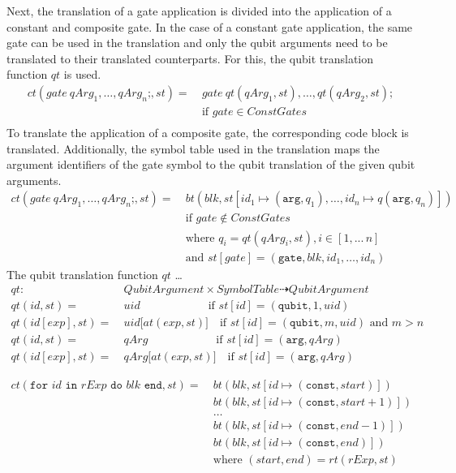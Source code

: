 Next, the translation of a gate application is divided into the application of a constant and composite gate. In the case of a constant gate application, the same gate can be used in the translation and only the qubit arguments need to be translated to their translated counterparts. For this, the qubit translation function $qt$ is used. 
\begin{align*}
    ct(gate \ qArg_1, \dots, qArg_n\texttt{;}, st) = \ & gate \ qt(qArg_1, st), \dots, qt(qArg_2, st); \\
                                                       & \text{if } gate \in ConstGates\\
\end{align*}
To translate the application of a composite gate, the corresponding code block is translated. Additionally, the symbol table used in the translation maps the argument identifiers of the gate symbol to the qubit translation of the given qubit arguments.
\begin{align*}
    ct(gate \ qArg_1, \dots, qArg_n\texttt{;}, st) = \ & bt(blk, st[id_1 \mapsto (\texttt{arg}, q_1), \dots, id_n \mapsto q(\texttt{arg}, q_n)]) \\
        &\text{if } gate \not\in ConstGates\\
        &\text{where } q_i = qt(qArg_i, st), i \in [1, ...\, n]\\
        &\text{and } st[gate] = (\texttt{gate}, blk, id_1, \dots, id_n)
\end{align*}
The qubit translation function $qt$ \dots
\begin{align*}
    qt :\ & \displaystyle QubitArgument \times SymbolTable \dashrightarrow QubitArgument\\
    qt(id, st) = \ & uid \quad\quad\quad\quad\quad\quad \text{if } st[id] = (\texttt{qubit}, 1, uid)\\
    qt(id[exp], st) = \ & uid\texttt{[}at(exp, st)\texttt{]} \quad \text{if } st[id] = (\texttt{qubit}, m, uid) \text{ and } m > n\\
    qt(id, st) = \ & qArg \quad\quad\quad\quad\quad\quad \text{if } st[id] = (\texttt{arg}, qArg)\\
    qt(id[exp], st) = \ & qArg\texttt{[}at(exp, st)\texttt{]} \quad \text{if } st[id] = (\texttt{arg}, qArg)
\end{align*}

\begin{align*}
    ct(\texttt{for } id \texttt{ in } rExp \texttt{ do } blk \texttt{ end}, st) = \ 
        & bt(blk, st[id \mapsto (\texttt{const}, start)])\\
        & bt(blk, st[id \mapsto (\texttt{const}, start + 1)])\\
        & \dots\\
        & bt(blk, st[id \mapsto (\texttt{const}, end - 1)])\\
        & bt(blk, st[id \mapsto (\texttt{const}, end)])\\
        & \text{where } (start, end) = rt(rExp, st)
\end{align*}

